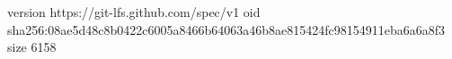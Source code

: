 version https://git-lfs.github.com/spec/v1
oid sha256:08ae5d48c8b0422c6005a8466b64063a46b8ae815424fc98154911eba6a6a8f3
size 6158
